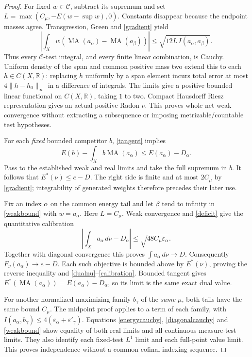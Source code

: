 \documentclass[11pt]{article}
\newcommand{\C}{\mathcal C}
\newcommand{\MA}{\operatorname{MA}}
\newcommand{\R}{\mathbb R}
\begin{document}
\begin{proof}
For fixed $w\in\C$, subtract its supremum and set
$L=\max(C_\mu,-E(w-\sup w),0)$. Constants disappear because
the endpoint masses agree. Transgression, Green and
\eqref{gradient} yield
\begin{equation}\label{weakbound}
 \left|\int_Xw(\MA(a_\alpha)-\MA(a_\beta))\right|
       \le\sqrt{12L\,I(a_\alpha,a_\beta)}.
\end{equation}
Thus every $\C$-test integral, and every finite linear combination,
is Cauchy. Uniform density of the span and common positive mass two
extend this to each $h\in C(X,\R)$: replacing $h$ uniformly by
a span element incurs total error at most $4\|h-h_0\|_\infty$
in a difference of integrals. The limits give a positive bounded
linear functional on $C(X,\R)$, taking $1$ to two. Compact
Hausdorff Riesz representation gives an actual positive Radon $\nu$.
This proves whole-net weak convergence without extracting a
subsequence or imposing metrizable/countable test hypotheses.

For each \emph{fixed} bounded competitor $b$, \eqref{tangent}
implies
\[
 E(b)-\int_Xb\MA(a_\alpha)\le E(a_\alpha)-D_\alpha.
\]
Pass to the established weak and real limits and take the full
supremum in $b$. It follows that $E^*(\nu)\le e-D$.
The right side is finite and at most $2C_\mu$ by
\eqref{gradient}; integrability of generated weights therefore
precedes their later use.

Fix an index $\alpha$ on the common energy tail and let $\beta$
tend to infinity in \eqref{weakbound} with $w=a_\alpha$.
Here $L=C_\mu$. Weak convergence and \eqref{deficit} give the
quantitative calibration
\begin{equation}\label{quantcal}
 \left|\int_Xa_\alpha\,d\nu-D_\alpha\right|
              \le\sqrt{48C_\mu\varepsilon_\alpha}.
\end{equation}
Together with diagonal convergence this proves
$\int a_\alpha\,d\nu\to D$. Consequently
$F_\nu(a_\alpha)\to e-D$. Each such objective is bounded above
by $E^*(\nu)$, proving the reverse inequality and
\eqref{dualnu}--\eqref{calibration}. Bounded tangent gives
$E^*(\MA(a_\alpha))=E(a_\alpha)-D_\alpha$, so its limit is
the same exact dual value.

For another normalized maximizing family $b_\gamma$ of the
\emph{same} $\mu$, both tails have the same bound $C_\mu$.
The midpoint proof applies to a term of each family, with
$I(a_\alpha,b_\gamma)\le4(\varepsilon_\alpha+
\varepsilon'_\gamma)$. Equations \eqref{energycauchy},
\eqref{diagonalcauchy} and \eqref{weakbound} show equality of
both real limits and all continuous measure-test limits. They also
identify each fixed-test $L^1$ limit and each full-point value limit.
This proves independence without a common cofinal indexing sequence.
\end{proof}
\end{document}

